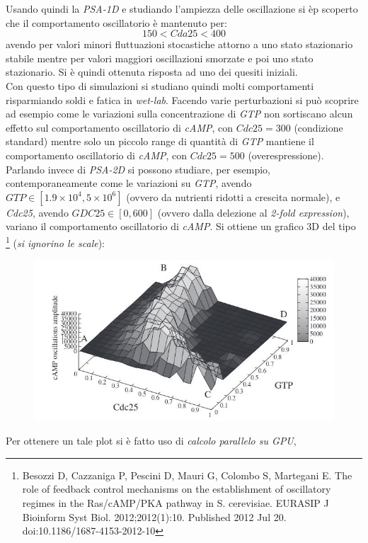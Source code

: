 \documentclass[a4paper,12pt, oneside]{book}
\begin{document}
Usando quindi la \textit{PSA-1D} e studiando l'ampiezza delle oscillazione si èp
scoperto che il comportamento oscillatorio è mantenuto per:
\[150<Cda25<400\]
avendo per valori minori fluttuazioni stocastiche attorno a uno stato
stazionario stabile mentre per valori maggiori oscillazioni smorzate e poi uno
stato stazionario. Si è quindi ottenuta risposta ad uno dei quesiti iniziali.\\
Con questo tipo di simulazioni si studiano quindi molti comportamenti
risparmiando soldi e fatica in \textit{wet-lab}. Facendo varie perturbazioni si
può scoprire ad esempio come le variazioni sulla concentrazione di \textit{GTP}
non sortiscano alcun effetto sul comportamento oscillatorio di \textit{cAMP},
con $Cdc25=300$ (condizione standard) mentre solo un piccolo range di quantità
di \textit{GTP} 
mantiene il comportamento oscillatorio di \textit{cAMP}, con $Cdc25=500$
(overespressione).\\
Parlando invece di \textit{PSA-2D} si possono studiare, per esempio,
contemporaneamente come le variazioni su \textit{GTP}, avendo $GTP\in[1.9\times
10^4, 5\times 10^6]$ (ovvero da nutrienti ridotti a crescita normale), e
\textit{Cdc25}, avendo $GDC25\in[0, 600]$ (ovvero dalla delezione al
\textit{2-fold expression}), variano 
il comportamento oscillatorio di \textit{cAMP}. Si ottiene un grafico 3D del
tipo
\footnote{Besozzi D, Cazzaniga P, Pescini D, 
  Mauri G, 
  Colombo S, Martegani E. The role of feedback control mechanisms on the
  establishment of oscillatory regimes in the Ras/cAMP/PKA pathway in
  S. cerevisiae. EURASIP J Bioinform Syst Biol. 2012;2012(1):10. Published 2012
  Jul 20. doi:10.1186/1687-4153-2012-10} (\textit{si ignorino le scale}):
\begin{figure}[H]
  \centering
  \includegraphics[scale = 0.45]{img/glucosimu3.jpg}
\end{figure}
Per ottenere un tale plot si è fatto uso di \textit{calcolo parallelo su GPU},
\end{document}
